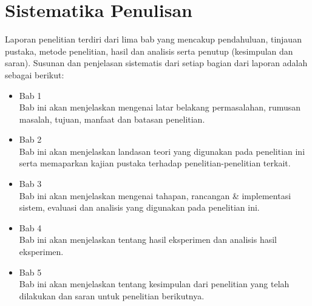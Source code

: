 \section{Sistematika Penulisan}
Laporan penelitian terdiri dari lima bab yang mencakup pendahuluan, tinjauan pustaka, metode penelitian, hasil dan analisis serta penutup (kesimpulan dan saran). Susunan dan penjelasan sistematis dari setiap bagian dari laporan adalah sebagai berikut:

\begin{itemize}
	\item Bab 1 \babSatu \\
	Bab ini akan menjelaskan mengenai latar belakang permasalahan, rumusan masalah, tujuan, manfaat dan batasan penelitian.
	
	\item Bab 2 \babDua \\
	Bab ini akan menjelaskan landasan teori yang digunakan pada penelitian ini serta memaparkan kajian pustaka terhadap penelitian-penelitian terkait.
	
	\item Bab 3 \babTiga \\
	Bab ini akan menjelaskan mengenai tahapan, rancangan \& implementasi sistem, evaluasi dan analisis yang digunakan pada penelitian ini.
	
	\item Bab 4 \babEmpat \\
	Bab ini akan menjelaskan tentang hasil eksperimen dan analisis hasil eksperimen.
	
	\item Bab 5 \babLima \\
	Bab ini akan menjelaskan tentang kesimpulan dari penelitian yang telah dilakukan dan saran untuk penelitian berikutnya.
\end{itemize}

